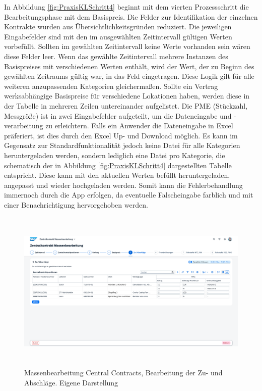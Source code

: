 In Abbildung \ref{fig:PraxisKLSchritt4} beginnt mit dem vierten Prozessschritt die Bearbeitungsphase mit dem Basispreis. Die Felder zur Identifikation der einzelnen Kontrakte wurden aus Übersichtlichkeitsgründen reduziert. Die jeweiligen Eingabefelder sind mit den im ausgewählten Zeitintervall gültigen Werten vorbefüllt. Sollten im gewählten Zeitintervall keine Werte vorhanden sein wären diese Felder leer. Wenn das gewählte Zeitintervall mehrere Instanzen des Basispreises mit verschiedenen Werten enthält, wird der Wert, der zu Beginn des gewählten Zeitraums gültig war, in das Feld eingetragen. Diese Logik gilt für alle weiteren anzupassenden Kategorien gleicherma\ss en. Sollte ein Vertrag werksabhängige Basispreise für verschiedene Lokationen haben, werden diese in der Tabelle in mehreren Zeilen untereinander aufgelistet. Die PME (Stückzahl, Messgrö\ss e) ist in zwei Eingabefelder aufgeteilt, um die Dateneingabe und -verarbeitung zu erleichtern. Falls ein Anwender die Dateneingabe in Excel präferiert, ist dies durch den Excel Up- und Download möglich. Es kann im Gegensatz zur Standardfunktionalität jedoch keine Datei für alle Kategorien heruntergeladen werden, sondern lediglich eine Datei pro Kategorie, die schematisch der in Abbildung \ref{fig:PraxisKLSchritt4} dargestellten Tabelle entspricht. Diese kann mit den aktuellen Werten befüllt heruntergeladen, angepasst und wieder hochgeladen werden. Somit kann die Fehlerbehandlung immernoch durch die App erfolgen, da eventuelle Falscheingabe farblich und mit einer Benachrichtigung hervorgehoben werden.

\begin{figure}[H]
    \centering
    \includegraphics[height=7.78cm]{Bilder/Praxisteil-KL-Schritt-5.png}
    \caption[Massenbearbeitung Central Contracts, Bearbeitung der Zu- und Abschläge]{Massenbearbeitung Central Contracts, Bearbeitung der Zu- und Abschläge. Eigene Darstellung}
    \label{fig:PraxisKLSchritt5}
\end{figure}

